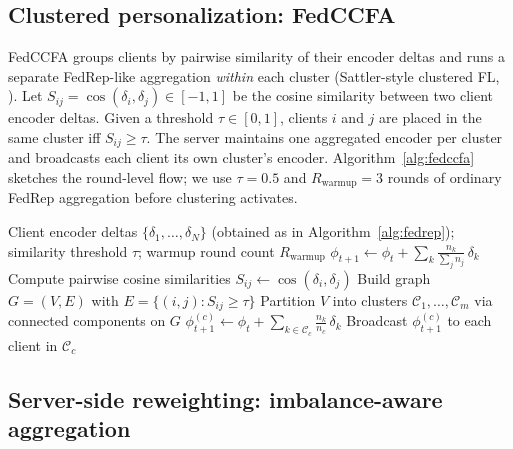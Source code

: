 \documentclass[a4paper,fleqn,doubleblind]{cas-sc}
\begin{document}
\subsection{Clustered personalization: FedCCFA}
\label{subsec:fedccfa}

FedCCFA groups clients by pairwise similarity of their encoder
deltas and runs a separate FedRep-like aggregation \emph{within}
each cluster (Sattler-style clustered FL,
\citealp{Sattler2020CFL}). Let $S_{ij} = \cos(\delta_i, \delta_j)
\in [-1, 1]$ be the cosine similarity between two client encoder
deltas. Given a threshold $\tau \in [0, 1]$, clients $i$ and $j$
are placed in the same cluster iff $S_{ij} \geq \tau$. The server
maintains one aggregated encoder per cluster and broadcasts each
client its own cluster's encoder. Algorithm~\ref{alg:fedccfa}
sketches the round-level flow; we use $\tau = 0.5$ and
$R_{\mathrm{warmup}} = 3$ rounds of ordinary FedRep aggregation
before clustering activates.

\begin{algorithm}[!ht]
\caption{FedCCFA round at communication round $t$.}
\label{alg:fedccfa}
\begin{algorithmic}[1]
\Require Client encoder deltas $\{\delta_1, \ldots, \delta_N\}$ (obtained as in Algorithm~\ref{alg:fedrep}); similarity threshold $\tau$; warmup round count $R_{\mathrm{warmup}}$
    \State $\phi_{t+1} \gets \phi_t + \sum_{k} \frac{n_k}{\sum_{j} n_j}\, \delta_k$ 
\Else
    \State Compute pairwise cosine similarities $S_{ij} \gets \cos(\delta_i, \delta_j)$
    \State Build graph $G = (V, E)$ with $E = \{(i, j) : S_{ij} \geq \tau\}$
    \State Partition $V$ into clusters $\mathcal{C}_1, \ldots, \mathcal{C}_m$ via connected components on $G$
        \State $\phi^{(c)}_{t+1} \gets \phi_t + \sum_{k \in \mathcal{C}_c} \frac{n_k}{n_c}\, \delta_k$
    \EndFor
    \State Broadcast $\phi^{(c)}_{t+1}$ to each client in $\mathcal{C}_c$
\EndIf
\end{algorithmic}
\end{algorithm}

\subsection{Server-side reweighting: imbalance-aware aggregation}
\label{subsec:reweight}
\end{document}
